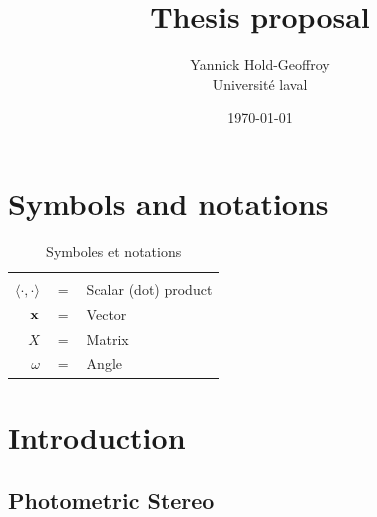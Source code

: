 \documentclass{report}
\title{Thesis proposal}
\author{Yannick Hold-Geoffroy  \\
    Universit\'e laval  \\
    }
\date{\today}
\begin{document}
 

\maketitle

\tableofcontents

\newcommand{\boldomega}{\boldsymbol \omega} %
\newcommand{\boldmu}{\boldsymbol \mu} %
\newcommand{\bolddelta}{\boldsymbol \delta} %

\graphicspath{{figures/}}



\chapter*{Symbols and notations}

\begin{table}[htbp]\caption{Symboles et notations}
\centering %
\begin{tabular}{r c p{10cm} }

\hline & & \\
$\langle \cdot, \cdot \rangle$      & $=$ & Scalar (dot) product \\
$\bold{x}$                          & $=$ & Vector \\
$X$                                 & $=$ & Matrix \\
$\omega$                            & $=$ & Angle \\
\hline
\end{tabular}
\label{tab:TableOfNotationForMyResearch}
\end{table}


\chapter{Introduction}





\section{Photometric Stereo}
\end{document}
